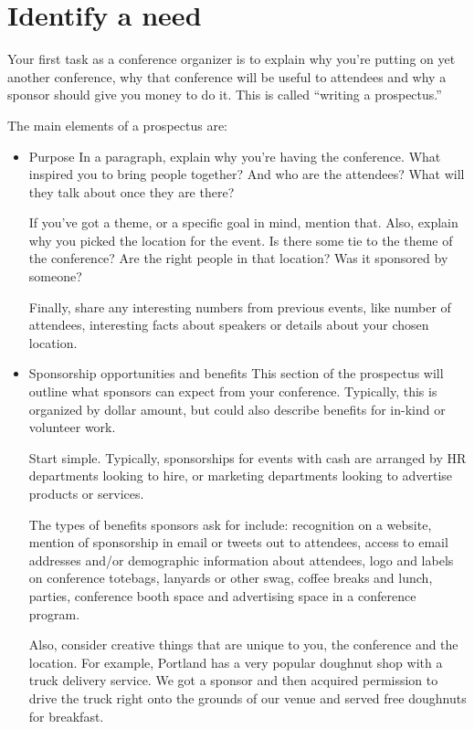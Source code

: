 \section*{Identify a need}

Your first task as a conference organizer is to explain why you’re putting on yet another conference, why that conference will be useful to attendees and why a sponsor should give you money to do it. This is called “writing a prospectus.”

The main elements of a prospectus are: 

\begin{itemize}
\item Purpose
In a paragraph, explain why you’re having the conference. What inspired you to bring people together? And who are the attendees? What will they talk about once they are there? 

If you’ve got a theme, or a specific goal in mind, mention that. Also, explain why you picked the location for the event. Is there some tie to the theme of the conference? Are the right people in that location? Was it sponsored by someone?

Finally, share any interesting numbers from previous events, like number of attendees, interesting facts about speakers or details about your chosen location. 

\item Sponsorship opportunities and benefits
This section of the prospectus will outline what sponsors can expect from your conference. Typically, this is organized by dollar amount, but could also describe benefits for in-kind or volunteer work.

Start simple. Typically, sponsorships for events with cash are arranged by HR departments looking to hire, or marketing departments looking to advertise products or services. 

The types of benefits sponsors ask for include: recognition on a website, mention of sponsorship in email or tweets out to attendees, access to email addresses and/or demographic information about attendees, logo and labels on conference totebags, lanyards or other swag, coffee breaks and lunch, parties, conference booth space and advertising space in a conference program. 

Also, consider creative things that are unique to you, the conference and the location. For example, Portland has a very popular doughnut shop with a truck delivery service. We got a sponsor and then acquired permission to drive the truck right onto the grounds of our venue and served free doughnuts for breakfast.


\end{itemize}
